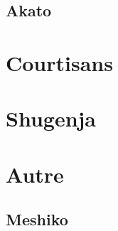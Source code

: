 \documentclass[10pt,a4paper]{book}
\begin{document}
\subsection{Akato}



\section{Courtisans}

\section{Shugenja}

\section{Autre}

\subsection{Meshiko}
\end{document}
